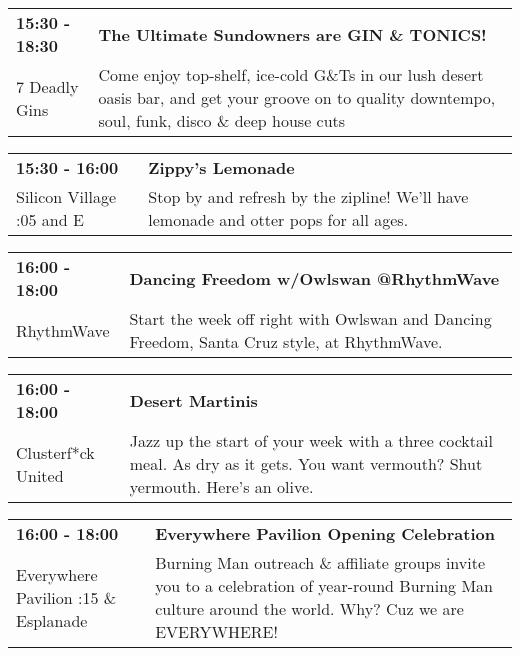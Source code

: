 \begin{tabular}{ p{1in} p{2.2in} }
    \textbf{15:30 - 18:30} & \textbf{The Ultimate Sundowners are GIN \& TONICS!} \\
    7 Deadly Gins \newline  & Come enjoy top-shelf, ice-cold G\&Ts in our lush desert oasis bar, and get your groove on to quality downtempo, soul, funk, disco \& deep house cuts \\
    \hline 
\end{tabular}
    
\begin{tabular}{ p{1in} p{2.2in} }
    \textbf{15:30 - 16:00} & \textbf{Zippy's Lemonade} \\
    Silicon Village \newline 6:05 and E & Stop by and refresh by the zipline!  We'll have lemonade and otter pops for all ages. \\
    \hline 
\end{tabular}
    
\begin{tabular}{ p{1in} p{2.2in} }
    \textbf{16:00 - 18:00} & \textbf{Dancing Freedom w/Owlswan @RhythmWave} \\
    RhythmWave \newline  & Start the week off right with Owlswan and Dancing Freedom, Santa Cruz style, at RhythmWave. \\
    \hline 
\end{tabular}
    
\begin{tabular}{ p{1in} p{2.2in} }
    \textbf{16:00 - 18:00} & \textbf{Desert Martinis} \\
    Clusterf*ck United \newline  & Jazz up the start of your week with a three cocktail meal. As dry as it gets. You want vermouth? Shut yermouth. Here's an olive. \\
    \hline 
\end{tabular}
    
\begin{tabular}{ p{1in} p{2.2in} }
    \textbf{16:00 - 18:00} & \textbf{Everywhere Pavilion Opening Celebration} \\
    Everywhere Pavilion \newline 6:15 \& Esplanade & Burning Man outreach \& affiliate groups invite you to a celebration of year-round Burning Man culture around the world. Why? Cuz we are EVERYWHERE! \\
    \hline 
\end{tabular}
    
